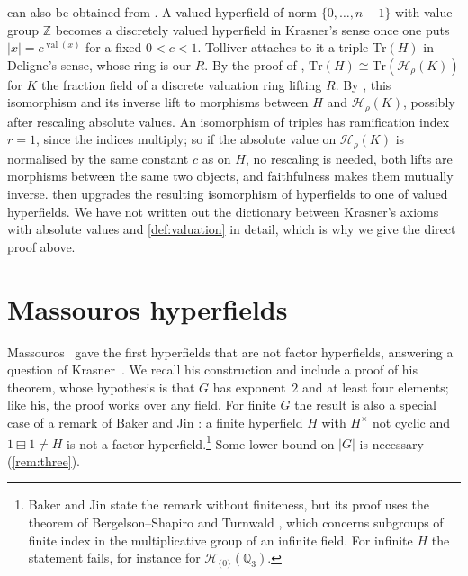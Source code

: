 \documentclass[11pt]{amsart}
\numberwithin{equation}{section}
\newcommand{\hminus}{\boxminus}
\newcommand{\val}{\operatorname{val}}
\newcommand{\Hr}{\mathcal H_\rho}
\newcommand{\Z}{\mathbb Z}
\begin{document}
\begin{remark}\label{rem:tolliver}
 can also be obtained from \cite{Tolliver16}. A valued hyperfield of norm $\{0,\dots,n-1\}$ with value group $\Z$ becomes a discretely valued hyperfield in Krasner's sense \cite[Definition~1.4]{Tolliver16} once one puts $\lvert x\rvert=c^{\val(x)}$ for a fixed $0<c<1$. Tolliver attaches to it a triple $\mathrm{Tr}(H)$ in Deligne's sense, whose ring is our $R$. By the proof of \cite[Theorem~7.5]{Tolliver16}, $\mathrm{Tr}(H)\cong\mathrm{Tr}(\Hr(K))$ for $K$ the fraction field of a discrete valuation ring lifting $R$. By \cite[Theorem~1.12]{Tolliver16}, this isomorphism and its inverse lift to morphisms between $H$ and $\Hr(K)$, possibly after rescaling absolute values. An isomorphism of triples has ramification index $r=1$, since the indices multiply; so if the absolute value on $\Hr(K)$ is normalised by the same constant $c$ as on $H$, no rescaling is needed, both lifts are morphisms between the same two objects, and faithfulness \cite[Corollary~6.2]{Tolliver16} makes them mutually inverse.  then upgrades the resulting isomorphism of hyperfields to one of valued hyperfields. We have not written out the dictionary between Krasner's axioms with absolute values and \cref{def:valuation} in detail, which is why we give the direct proof above.
\end{remark}

\section{Massouros hyperfields}\label{sec:massouros}

Massouros~\cite[\S3]{Massouros85} gave the first hyperfields that are not factor hyperfields, answering a question of Krasner~\cite{Krasner83}. We recall his construction and include a proof of his theorem, whose hypothesis is that $G$ has exponent~$2$ and at least four elements; like his, the proof works over any field. For finite $G$ the result is also a special case of a remark of Baker and Jin \cite[Remark~4.4]{BakerJin21}: a finite hyperfield $H$ with $H^\times$ not cyclic and $1\hminus1\ne H$ is not a factor hyperfield.\footnote{Baker and Jin state the remark without finiteness, but its proof uses the theorem of Bergelson--Shapiro and Turnwald \cite[Theorem~4.1]{BakerJin21}, which concerns subgroups of finite index in the multiplicative group of an infinite field. For infinite $H$ the statement fails, for instance for $\mathcal H_{\{0\}}(\mathbb Q_3)$.} Some lower bound on $|G|$ is necessary (\cref{rem:three}).
\end{document}
